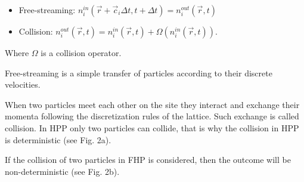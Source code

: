 \begin{itemize}
\item Free-streaming: $ n_i^{in}(\vec{r}+\vec{c}_{i}\Delta t, t+\Delta t) = n_i^{out}(\vec{r}, t) $
\item Collision: $ n_i^{out}(\vec{r}, t) = n_i^{in}(\vec{r}, t) + \Omega(n_i^{in}(\vec{r}, t)) $.
\end{itemize}
Where $\Omega$ is a collision operator.

Free-streaming is a simple transfer of particles according to their discrete velocities.

When two particles meet each other on the site they interact and exchange their momenta following the discretization rules of the lattice. Such exchange is called collision. In HPP only two particles can collide, that is why the collision in HPP is deterministic (see Fig. 2a).

If  the collision of two particles in FHP is considered, then the outcome will be non-deterministic (see Fig. 2b).

